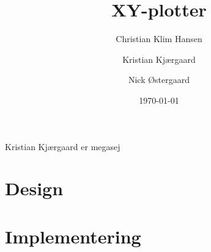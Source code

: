\documentclass{../mypaper}
\title{XY-plotter}
\author{Christian Klim Hansen \and Kristian Kjærgaard \and Nick Østergaard}
\date{\today}
\begin{document}
\begin{titlingpage}

  

  \strut \vfill
  {
    \footnotesize
    \noindent Kristian Kjærgaard er megasej   }

\end{titlingpage}

\frontmatter

\tableofcontents



\mainmatter




\part{Design}





\part{Implementering}





\backmatter



\nocite{*}



\listoffigures

\listoftables

\listoffixmes
\end{document}
